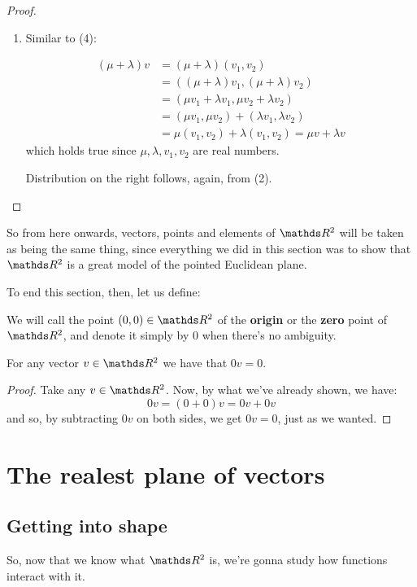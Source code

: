 \begin{proof}
\begin{enumerate}[(1)]
		\item Similar to (4):
		
		\begin{align*}
			(\mu+\lambda)v&=(\mu+\lambda)(v_1,v_2)\\
			&=((\mu+\lambda)v_1,(\mu+\lambda) v_2)\\
			&=(\mu v_1+\lambda v_1,\mu v_2+\lambda v_2)\\
			&=(\mu v_1,\mu v_2)+(\lambda v_1,\lambda v_2)\\
			&=\mu(v_1,v_2)+\lambda(v_1,v_2)=\mu v+\lambda v
		\end{align*}which holds true since $\mu,\lambda,v_1,v_2$ are real numbers.
		
		Distribution on the right follows, again, from (2).
	\end{enumerate}
\end{proof}

So from here onwards, vectors, points and elements of $\R^2$ will be taken as being the same thing, since everything we did in this section was to show that $\R^2$ is a great model of the pointed Euclidean plane.

To end this section, then, let us define:

\begin{df}
	We will call the point $(0,0)\in \R^2$ of the \textbf{origin} or the \textbf{zero} point of $\R^2$, and denote it simply by $0$ when there's no ambiguity.
\end{df}

\begin{prop}
	For any vector $v\in \R^2$ we have that $0v=0$.
\end{prop}
\begin{proof}
	Take any $v\in \R^2$. Now, by what we've already shown, we have:
	\[0v=(0+0)v=0v+0v\]and so, by subtracting $0v$ on both sides, we get $0v=0$, just as we wanted.
\end{proof}

\newpage
\section{The realest plane of vectors}
\subsection{Getting into shape}

So, now that we know what $\R^2$ is, we're gonna study how functions interact with it.

